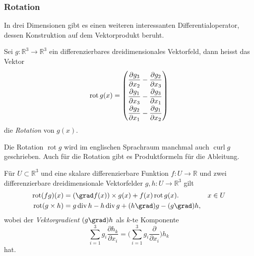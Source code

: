 %
%
\subsubsection{Rotation}
In drei Dimensionen gibt es einen weiteren interessanten Differentialoperator,
dessen Konstruktion auf dem Vektorprodukt beruht.

\begin{definition}[Rotation]
Sei $g\colon\mathbb{R}^3\to\mathbb{R}^3$ ein differenzierbares
dreidimensionales Vektorfeld, dann heisst das Vektor
\[
\operatorname{rot}g(x)
=
{\renewcommand{\arraystretch}{1.9}
\begin{pmatrix}
\displaystyle
\frac{\partial g_3}{\partial x_2}
-
\frac{\partial g_2}{\partial x_3}
\\
\displaystyle
\frac{\partial g_1}{\partial x_3}
-
\frac{\partial g_3}{\partial x_1}
\\
\displaystyle
\frac{\partial g_2}{\partial x_1}
-
\frac{\partial g_1}{\partial x_2}
\end{pmatrix}}
\]
die {\em Rotation} von $g(x)$.
\end{definition}

Die Rotation $\operatorname{rot}g$ wird im englischen Sprachraum manchmal
auch $\operatorname{curl}g$ geschrieben.
Auch für die Rotation gibt es Produktformeln für die Ableitung.

\begin{satz}
\label{buch:felder:fundamentallemma:satz:rotprodukt}
Für $U\subset\mathbb{R}^3$ und eine skalare differenzierbare Funktion
$f\colon U\to\mathbb{R}$ und zwei differenzierbare dreidimensionale
Vektorfelder $g,h\colon U\to\mathbb{R}^3$ gilt
\begin{align*}
\operatorname{rot}(fg)(x)
&=
(\grad f(x))\times g(x) + f(x)\operatorname{rot}g(x).
&&x\in U
\\
\operatorname{rot}(g\times h)
&=
g\operatorname{div}h
-
h\operatorname{div}g
+
(h\grad)g
-
(g\grad)h,
\end{align*}
wobei der {\em Vektorgradient} $(g\grad)h$ als $k$-te Komponente
\[
\sum_{i=1}^3 g_i\frac{\partial h_k}{\partial x_i}
=
\biggl(
\sum_{i=1}^3 g_i\frac{\partial}{\partial x_i}
\biggr)h_k
\]
hat.
\end{satz}

